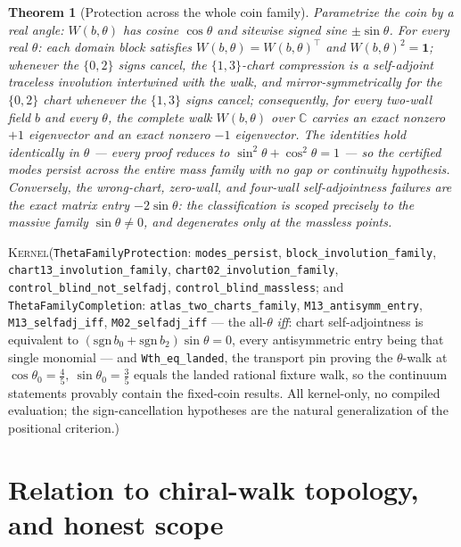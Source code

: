 \documentclass[11pt]{article}
\newcommand{\id}{\mathbf{1}}
\newcommand{\C}{\mathbb{C}}
\newcommand{\Kernel}{\textcolor{kernelcolor}{\textsc{Kernel}}}
\newtheorem{theorem}{Theorem}
\begin{document}
\begin{theorem}[Protection across the whole coin family]\label{thm:theta}
Parametrize the coin by a real angle: $W(b,\theta)$ has cosine
$\cos\theta$ and sitewise signed sine $\pm\sin\theta$.  For every real
$\theta$: each domain block satisfies $W(b,\theta)=W(b,\theta)^{\!\top}$
and $W(b,\theta)^2=\id$; whenever the $\{0,2\}$ signs cancel, the
$\{1,3\}$-chart compression is a self-adjoint traceless involution
intertwined with the walk, and mirror-symmetrically for the
$\{0,2\}$ chart whenever the $\{1,3\}$ signs cancel; consequently, for
every two-wall field $b$ and every $\theta$, the complete walk
$W(b,\theta)$ over $\C$ carries an exact nonzero $+1$ eigenvector and an
exact nonzero $-1$ eigenvector.  The identities hold identically in
$\theta$ --- every proof reduces to $\sin^2\theta+\cos^2\theta=1$ --- so
the certified modes persist across the entire mass family with no gap or
continuity hypothesis.  Conversely, the wrong-chart, zero-wall, and
four-wall self-adjointness failures are the exact matrix entry
$-2\sin\theta$: the classification is scoped precisely to the massive
family $\sin\theta\neq0$, and degenerates only at the massless points.
\end{theorem}
\noindent\Kernel{}\quad(\texttt{ThetaFamilyProtection}:
\texttt{modes\_persist}, \texttt{block\_involution\_family},
\texttt{chart13\_involution\_family}, \texttt{chart02\_involution\_family},
\texttt{control\_blind\_not\_selfadj}, \texttt{control\_blind\_massless};
and \texttt{ThetaFamilyCompletion}:
\texttt{atlas\_two\_charts\_family},
\texttt{M13\_antisymm\_entry}, \texttt{M13\_selfadj\_iff},
\texttt{M02\_selfadj\_iff} --- the all-$\theta$ \emph{iff}: chart
self-adjointness is equivalent to
$(\mathrm{sgn}\,b_0+\mathrm{sgn}\,b_2)\sin\theta=0$, every antisymmetric
entry being that single monomial --- and \texttt{Wth\_eq\_landed}, the
transport pin proving the $\theta$-walk at
$\cos\theta_0=\tfrac45,\ \sin\theta_0=\tfrac35$ equals the landed
rational fixture walk, so the continuum statements provably contain the
fixed-coin results.  All kernel-only, no compiled evaluation; the
sign-cancellation hypotheses are the natural generalization of the
positional criterion.)

\section{Relation to chiral-walk topology, and honest scope}
\end{document}
